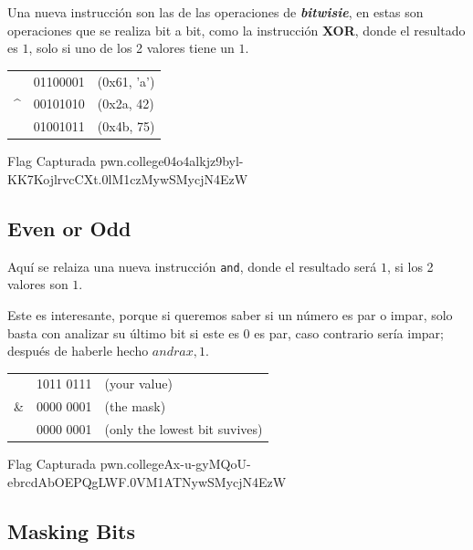 Una nueva instrucción son las de las operaciones de \textbf{\textit{bitwisie}}, en estas
son operaciones que se realiza bit a bit, como la instrucción \textbf{XOR},
donde el resultado es \( 1 \), solo si uno de los 2 valores tiene un \( 1 \).

\begin{center}
	\begin{tabular}{lcl}
		     & 01100001 & (0x61, 'a') \\
		\^{} & 00101010 & (0x2a, 42)  \\
		\midrule
		     & 01001011 & (0x4b, 75)
	\end{tabular}
\end{center}

\begin{flagbox}{Flag Capturada}
	pwn.college{04o4alkjz9byl-KK7KojlrvcCXt.0lM1czMywSMycjN4EzW}
\end{flagbox}

\subsection{Even or Odd}\label{subsec:even_or_odd}

Aquí se relaiza una nueva instrucción \texttt{and}, donde el resultado será \( 1 \), si
los 2 valores son \( 1 \).

Este es interesante, porque si queremos saber si un número es par o impar, solo basta con analizar su último bit
si este es 0 es par, caso contrario sería impar; después de haberle hecho \( and rax, 1 \).

\begin{center}
	\begin{tabular}{lcl}
		   & 1011 0111 & (your value)                  \\
		\& & 0000 0001 & (the mask)                    \\
		\midrule
		   & 0000 0001 & (only the lowest bit suvives)
	\end{tabular}
\end{center}

\begin{flagbox}{Flag Capturada}
	pwn.college{Ax-u-gyMQoU-ebrcdAbOEPQgLWF.0VM1ATNywSMycjN4EzW}
\end{flagbox}

\subsection{Masking Bits}\label{subsec:masking_bits}

